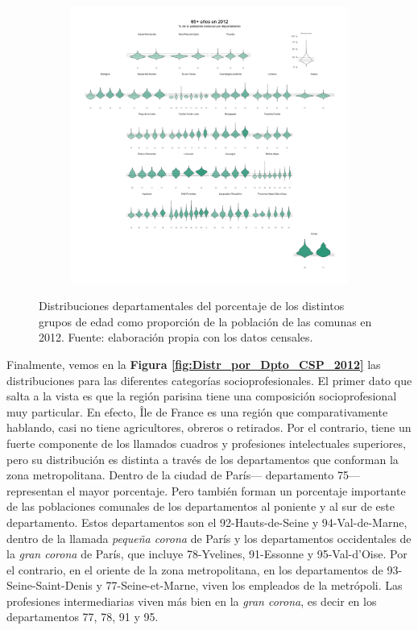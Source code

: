 \begin{figure}[h]
\begin{subfigure}{0.3\textwidth}
	\end{subfigure}
	~
	\begin{subfigure}{0.3\textwidth}
	\includegraphics[width = \textwidth]{Figs/AED/Geofacet_Distr_por_Dpto_Ed6_2012}
	\end{subfigure}
	\caption{Distribuciones departamentales del porcentaje de los distintos grupos de edad como proporción de la población de las comunas en 2012. Fuente: elaboración propia con los datos censales.}
	\label{fig:Distr_por_Dpto_Edades_2012}	
\end{figure}

Finalmente, vemos en la \textbf{Figura \ref{fig:Distr_por_Dpto_CSP_2012}} las distribuciones para las diferentes categorías socioprofesionales. El primer dato que salta a la vista es que la región parisina tiene una composición socioprofesional muy particular. En efecto, Île de France es una región que comparativamente hablando, casi no tiene agricultores, obreros o retirados. Por el contrario, tiene un fuerte componente de los llamados cuadros y profesiones intelectuales superiores, pero su distribución es distinta a través de los departamentos que conforman la zona metropolitana. Dentro de la ciudad de París--- departamento 75--- representan el mayor porcentaje. Pero también forman un porcentaje importante de las poblaciones comunales de los departamentos al poniente y al sur de este departamento.  Estos departamentos son el 92-Hauts-de-Seine y 94-Val-de-Marne, dentro de la llamada \textit{pequeña corona} de París y los departamentos occidentales de la \textit{gran corona} de París, que incluye 78-Yvelines, 91-Essonne y 95-Val-d'Oise. Por el contrario, en el oriente de la zona metropolitana, en los departamentos de 93-Seine-Saint-Denis y 77-Seine-et-Marne, viven los empleados de la metrópoli. Las profesiones intermediarias viven más bien en la \textit{gran corona}, es decir en los departamentos 77, 78, 91 y 95.\\
 
